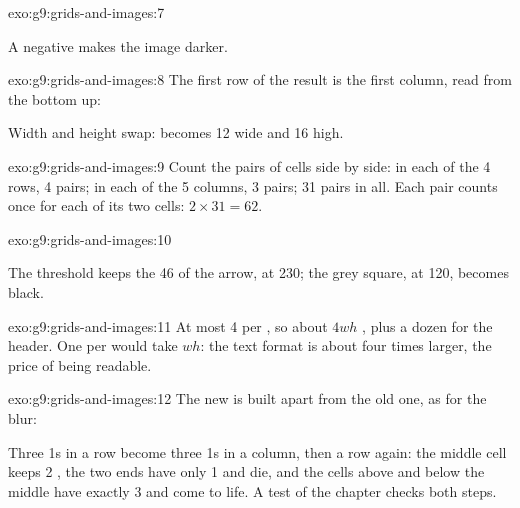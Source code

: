 \begin{solution}{exo:g9:grids-and-images:7}
\label{lst:g9:grids-and-images:sol-brighter}

A negative  makes the image darker.
\end{solution}

\begin{solution}{exo:g9:grids-and-images:8}
The first row of the result is the first column, read from the bottom up:

\label{lst:g9:grids-and-images:sol-rotate}

Width and height swap:  becomes 12  wide and 16 high.
\end{solution}

\begin{solution}{exo:g9:grids-and-images:9}
Count the pairs of cells side by side: in each of the 4 rows, 4 pairs; in each
of the 5 columns, 3 pairs; 31 pairs in all. Each pair counts once for each of
its two cells: $2 \times 31 = 62$.
\end{solution}

\begin{solution}{exo:g9:grids-and-images:10}
\label{lst:g9:grids-and-images:sol-white}

The threshold keeps the 46  of the arrow, at 230; the grey square, at
120, becomes black.
\end{solution}

\begin{solution}{exo:g9:grids-and-images:11}
At most 4  per , so about $4wh$ , plus a dozen for the
header. One  per  would take $wh$: the text format is about four
times larger, the price of being readable.
\end{solution}

\begin{solution}{exo:g9:grids-and-images:12}
The new  is built apart from the old one, as for the blur:

\label{lst:g9:grids-and-images:sol-life}

Three 1s in a row become three 1s in a column, then a row again: the middle
cell keeps 2 , the two ends have only 1 and die, and the cells above
and below the middle have exactly 3 and come to life. A test of the chapter
checks both steps.
\end{solution}


